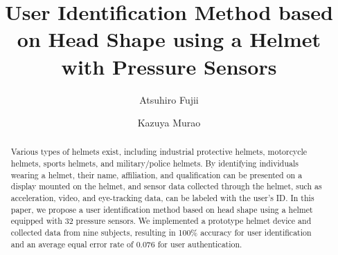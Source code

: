 \documentclass[sigconf,authordraft]{acmart}
\begin{document}
\title{User Identification Method based on Head Shape using a Helmet with Pressure Sensors}

\author{Atsuhiro Fujii}

\author{Kazuya Murao}

\renewcommand{\shortauthors}{Fujii and Murao}

\begin{abstract}
Various types of helmets exist, including industrial protective helmets, motorcycle helmets, sports helmets, and military/police helmets. By identifying individuals wearing a helmet, their name, affiliation, and qualification can be presented on a display mounted on the helmet, and sensor data collected through the helmet, such as acceleration, video, and eye-tracking data, can be labeled with the user's ID. In this paper, we propose a user identification method based on head shape using a helmet equipped with 32 pressure sensors.
We implemented a prototype helmet device and collected data from nine subjects, resulting in 100\% accuracy for user identification and an average equal error rate of 0.076 for user authentication.
\end{abstract}
\end{document}
